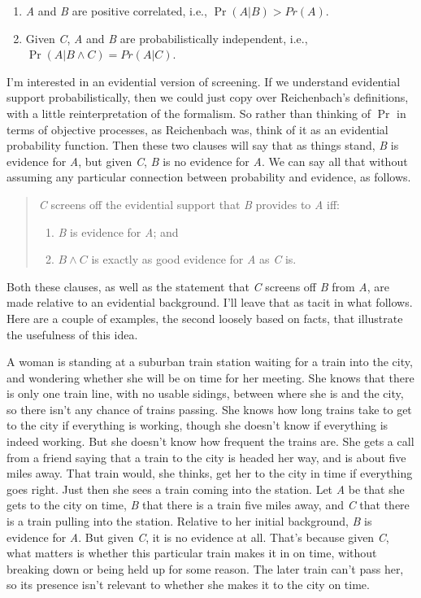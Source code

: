 \begin{enumerate}
\item{} \emph{A} and \emph{B} are positive correlated, i.e., $\Pr(A | B) > Pr(A)$.

\item{} Given \emph{C}, \emph{A} and \emph{B} are probabilistically independent, i.e., $\Pr(A | B \wedge C) = Pr(A | C)$.

\end{enumerate}
I'm interested in an evidential version of screening. If we understand evidential support probabilistically, then we could just copy over Reichenbach's definitions, with a little reinterpretation of the formalism. So rather than thinking of $\Pr$ in terms of objective processes, as Reichenbach was, think of it as an evidential probability function. Then these two clauses will say that as things stand, \emph{B} is evidence for \emph{A}, but given \emph{C}, \emph{B} is no evidence for \emph{A}. We can say all that without assuming any particular connection between probability and evidence, as follows.

\begin{quote}
\emph{C} screens off the evidential support that \emph{B} provides to \emph{A} iff:

\begin{enumerate}
\item{} \emph{B} is evidence for \emph{A}; and

\item{} $B \wedge C$ is exactly as good evidence for \emph{A} as \emph{C} is.

\end{enumerate}
\end{quote}
Both these clauses, as well as the statement that \emph{C} screens off \emph{B} from \emph{A}, are made relative to an evidential background. I'll leave that as tacit in what follows. Here are a couple of examples, the second loosely based on facts, that illustrate the usefulness of this idea.

A woman is standing at a suburban train station waiting for a train into the city, and wondering whether she will be on time for her meeting. She knows that there is only one train line, with no usable sidings, between where she is and the city, so there isn't any chance of trains passing. She knows how long trains take to get to the city if everything is working, though she doesn't know if everything is indeed working. But she doesn't know how frequent the trains are. She gets a call from a friend saying that a train to the city is headed her way, and is about five miles away. That train would, she thinks, get her to the city in time if everything goes right. Just then she sees a train coming into the station. Let \emph{A} be that she gets to the city on time, \emph{B} that there is a train five miles away, and \emph{C} that there is a train pulling into the station. Relative to her initial background, \emph{B} is evidence for \emph{A}. But given \emph{C}, it is no evidence at all. That's because given \emph{C}, what matters is whether this particular train makes it in on time, without breaking down or being held up for some reason. The later train can't pass her, so its presence isn't relevant to whether she makes it to the city on time.

